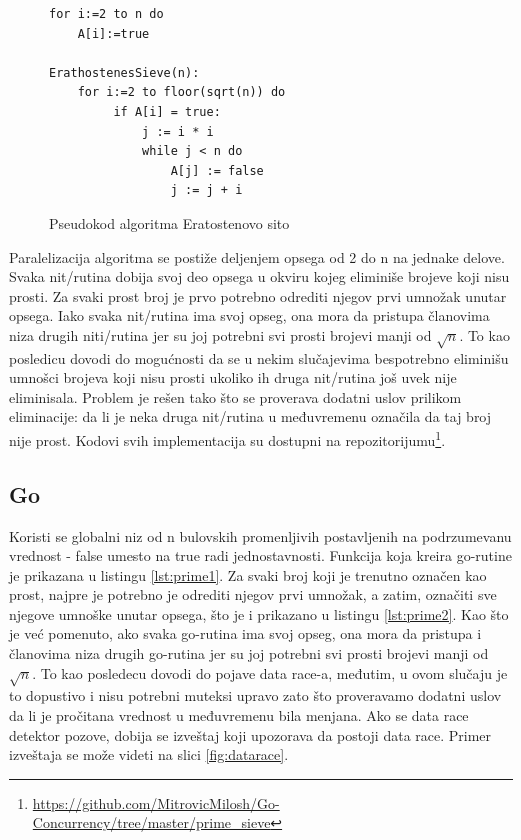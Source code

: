 \documentclass[12pt,oneside]{memoir}
\begin{document}
\begin{figure}
\begin{center}

\begin{Verbatim}[fontsize=\small]
for i:=2 to n do
    A[i]:=true

ErathostenesSieve(n):
    for i:=2 to floor(sqrt(n)) do 
         if A[i] = true:
             j := i * i
             while j < n do
                 A[j] := false 
                 j := j + i
\end{Verbatim}

\caption{Pseudokod algoritma Eratostenovo sito}
\label{fig:prime_pseudo}
\end{center}
\end{figure}

Paralelizacija algoritma se postiže deljenjem opsega od 2 do n na jednake delove. Svaka nit/rutina dobija svoj deo opsega u okviru kojeg eliminiše brojeve koji nisu prosti. Za svaki prost broj je prvo potrebno odrediti njegov prvi umnožak unutar opsega. Iako svaka nit/rutina ima svoj opseg, ona mora da pristupa članovima niza drugih niti/rutina jer su joj potrebni svi prosti brojevi manji od $\sqrt{n}$. To kao posledicu dovodi do mogućnosti da se u nekim slučajevima bespotrebno eliminišu umnošci brojeva koji nisu prosti ukoliko ih druga nit/rutina još uvek nije eliminisala. Problem je rešen tako što se proverava dodatni uslov prilikom eliminacije: da li je neka druga nit/rutina u međuvremenu označila da taj broj nije prost. Kodovi svih implementacija su dostupni na repozitorijumu\footnote{\url{https://github.com/MitrovicMilosh/Go-Concurrency/tree/master/prime_sieve}}.
\\



\subsection{Go}

Koristi se globalni niz od n bulovskih promenljivih postavljenih na podrzumevanu vrednost - false umesto na true radi jednostavnosti.  Funkcija koja kreira go-rutine je prikazana u listingu \ref{lst:prime1}. Za svaki broj koji je trenutno označen kao prost, najpre je potrebno je odrediti njegov prvi umnožak, a zatim, označiti sve njegove umnoške unutar opsega, što je i prikazano u listingu \ref{lst:prime2}. Kao što je već pomenuto, ako svaka go-rutina ima svoj opseg, ona mora da pristupa i članovima niza drugih go-rutina jer su joj potrebni svi prosti brojevi manji od $\sqrt{n}$. To kao posledecu dovodi do pojave data race-a, međutim, u ovom slučaju je to dopustivo i nisu potrebni muteksi upravo zato što proveravamo dodatni uslov da li je pročitana vrednost u međuvremenu bila menjana. Ako se data race detektor pozove, dobija se izveštaj koji upozorava da postoji data race. Primer izveštaja se može videti na slici \ref{fig:datarace}. 
\end{document}
